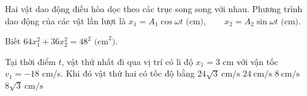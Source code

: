 \begin{ex}
Hai vật dao động điều hòa dọc theo các trục song song với nhau. Phương trình dao động của các vật lần lượt là
$x_1=A_1 \cos\omega t \text{ (cm)}, \qquad x_2=A_2 \sin\omega t \text{ (cm)}.$

Biết
$64x_1^2+36x_2^2=48^2 \text{ (cm}^2\text{)}.$

Tại thời điểm $t$, vật thứ nhất đi qua vị trí có li độ $x_1=3$ cm với vận tốc $v_1=-18$ cm/s. Khi đó vật thứ hai có tốc độ bằng
\choice
{$24\sqrt{3}\ \text{cm/s}$}
{$24\ \text{cm/s}$}
{$8\ \text{cm/s}$}
{\True $8\sqrt{3}\ \text{cm/s}$}
\end{ex}

